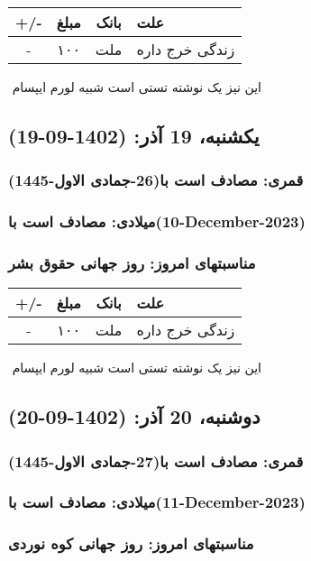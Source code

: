 \documentclass{article}
\newcommand{\rnote}[1]{\marginpar{\textcolor{color}{\StrSubstitute{\##1}{ }{\_}}}}
\newcommand{\myRow}[4]{
    #1 & #2 & #3 & #4 \\ \hline
}
\begin{document}
\begin{tabular}{ | c | c | c | p{5cm} |}
    \hline
    \myRow{ +/- }{مبلغ}{بانک}{علت}
    \myRow{-}{۱۰۰}{ملت}{زندگی خرج داره}
\end{tabular}
\newline
\newline

‌
\rnote{تست}
این نیز یک نوشته تستی است شبیه لورم ایپسام




\newpage
{}
\textcolor{color}{
\section{ یکشنبه، 19 آذر: (1402-09-19) }
\subsubsection*{قمری: مصادف است با(26-جمادی الاول-1445)} 
\subsubsection*{میلادی: مصادف است با(10-December-2023)}
\subsubsection*{مناسبتهای امروز: روز جهانی حقوق بشر}
}


\begin{tabular}{ | c | c | c | p{5cm} |}
    \hline
    \myRow{ +/- }{مبلغ}{بانک}{علت}
    \myRow{-}{۱۰۰}{ملت}{زندگی خرج داره}
\end{tabular}
\newline
\newline

‌
\rnote{تست}
این نیز یک نوشته تستی است شبیه لورم ایپسام




\newpage
{}
\textcolor{color}{
\section{ دوشنبه، 20 آذر: (1402-09-20) }
\subsubsection*{قمری: مصادف است با(27-جمادی الاول-1445)} 
\subsubsection*{میلادی: مصادف است با(11-December-2023)}
\subsubsection*{مناسبتهای امروز: روز جهانی کوه نوردی}
}
\end{document}
